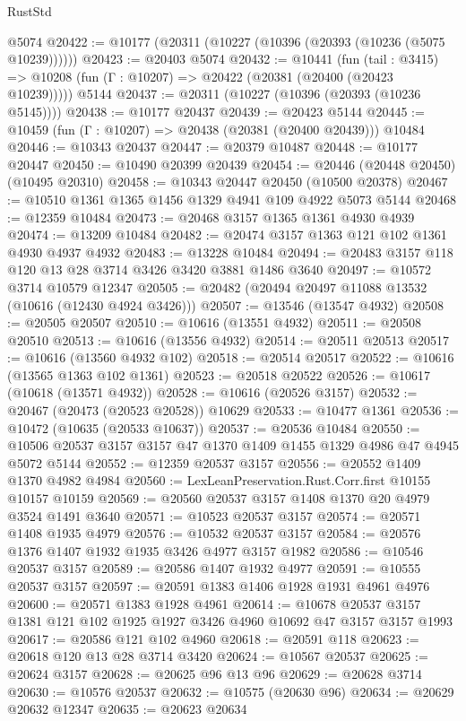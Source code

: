 \begin{lexlean}{RustStd}
\begin{coremodule}
    @5074
@20422 := @10177 (@20311 (@10227 (@10396 (@20393 (@10236 (@5075 @10239))))))
@20423 := @20403 @5074
@20432 := @10441
    (fun (tail : @3415) => @10208 (fun (Γ : @10207) => @20422 (@20381 (@20400 (@20423 @10239)))))
    @5144
@20437 := @20311 (@10227 (@10396 (@20393 (@10236 @5145))))
@20438 := @10177 @20437
@20439 := @20423 @5144
@20445 := @10459 (fun (Γ : @10207) => @20438 (@20381 (@20400 @20439))) @10484
@20446 := @10343 @20437
@20447 := @20379 @10487
@20448 := @10177 @20447
@20450 := @10490 @20399 @20439
@20454 := @20446 (@20448 @20450) (@10495 @20310)
@20458 := @10343 @20447 @20450 (@10500 @20378)
@20467 := @10510 @1361 @1365 @1456 @1329 @4941 @109 @4922 @5073 @5144
@20468 := @12359 @10484
@20473 := @20468 @3157 @1365 @1361 @4930 @4939
@20474 := @13209 @10484
@20482 := @20474 @3157 @1363 @121 @102 @1361 @4930 @4937 @4932
@20483 := @13228 @10484
@20494 := @20483 @3157 @118 @120 @13 @28 @3714 @3426 @3420 @3881 @1486 @3640
@20497 := @10572 @3714 @10579 @12347
@20505 := @20482 (@20494 @20497 @11088 @13532 (@10616 (@12430 @4924 @3426)))
@20507 := @13546 (@13547 @4932)
@20508 := @20505 @20507
@20510 := @10616 (@13551 @4932)
@20511 := @20508 @20510
@20513 := @10616 (@13556 @4932)
@20514 := @20511 @20513
@20517 := @10616 (@13560 @4932 @102)
@20518 := @20514 @20517
@20522 := @10616 (@13565 @1363 @102 @1361)
@20523 := @20518 @20522
@20526 := @10617 (@10618 (@13571 @4932))
@20528 := @10616 (@20526 @3157)
@20532 := @20467 (@20473 (@20523 @20528)) @10629
@20533 := @10477 @1361
@20536 := @10472 (@10635 (@20533 @10637))
@20537 := @20536 @10484
@20550 := @10506 @20537 @3157 @3157 @47 @1370 @1409 @1455 @1329 @4986 @47 @4945 @5072 @5144
@20552 := @12359 @20537 @3157
@20556 := @20552 @1409 @1370 @4982 @4984
@20560 := LexLeanPreservation.Rust.Corr.first @10155 @10157 @10159
@20569 := @20560 @20537 @3157 @1408 @1370 @20 @4979 @3524 @1491 @3640
@20571 := @10523 @20537 @3157
@20574 := @20571 @1408 @1935 @4979
@20576 := @10532 @20537 @3157
@20584 := @20576 @1376 @1407 @1932 @1935 @3426 @4977 @3157 @1982
@20586 := @10546 @20537 @3157
@20589 := @20586 @1407 @1932 @4977
@20591 := @10555 @20537 @3157
@20597 := @20591 @1383 @1406 @1928 @1931 @4961 @4976
@20600 := @20571 @1383 @1928 @4961
@20614 := @10678 @20537 @3157 @1381 @121 @102 @1925 @1927 @3426 @4960 @10692 @47 @3157 @3157 @1993
@20617 := @20586 @121 @102 @4960
@20618 := @20591 @118
@20623 := @20618 @120 @13 @28 @3714 @3420
@20624 := @10567 @20537
@20625 := @20624 @3157
@20628 := @20625 @96 @13 @96
@20629 := @20628 @3714
@20630 := @10576 @20537
@20632 := @10575 (@20630 @96)
@20634 := @20629 @20632 @12347
@20635 := @20623 @20634

\end{coremodule}
\end{lexlean}
